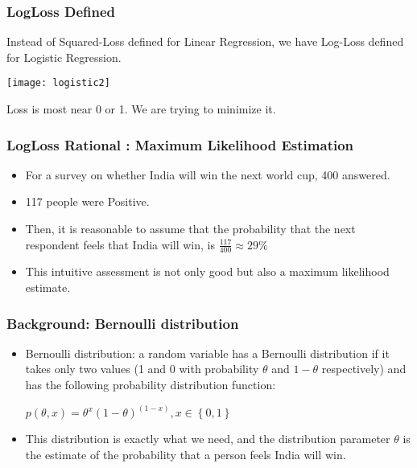\begin{frame}[fragile]\frametitle{LogLoss Defined}
Instead of Squared-Loss defined for Linear Regression, we have Log-Loss defined for Logistic Regression.
\begin{center}
\texttt{[image: logistic2]}
\end{center}

Loss is most near 0 or 1. We are trying to minimize it.


\end{frame}

\begin{frame}[fragile]\frametitle{LogLoss Rational : Maximum Likelihood Estimation}
\begin{itemize}
\item For a survey on whether India will win the next world cup, 400 answered.
\item 117 people were Positive.
\item Then, it is reasonable to assume that the probability that the next respondent feels that India will win,  is $\frac{117}{400} \approx 29\%$
\item This intuitive assessment is not only good but also a maximum likelihood estimate.
\end{itemize}
\end{frame}

\begin{frame}[fragile]\frametitle{Background: Bernoulli distribution}
\begin{itemize}
\item Bernoulli distribution: a random variable has a Bernoulli distribution if it takes only two values (1 and 0 with probability $\theta$ and $1- \theta$ respectively) and has the following probability distribution function: 

$ p \left( \theta, x\right) = \theta^{x} \left(1 - \theta\right)^{\left(1 - x\right)}, x \in \left\{0, 1\right\}$
\item This distribution is exactly what we need, and the distribution parameter $\theta$ is the estimate of the probability that a person feels India will win.
\end{itemize}
\end{frame}

